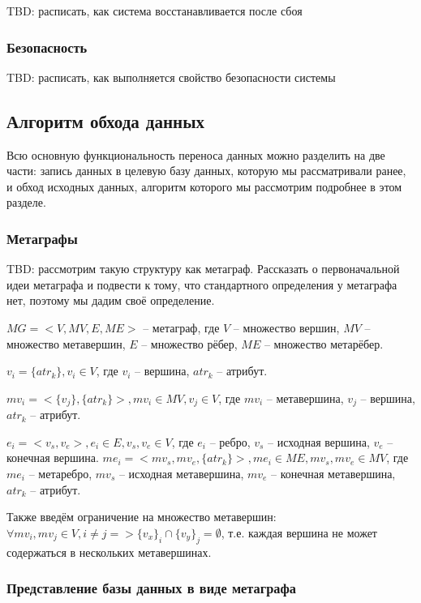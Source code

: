 TBD: расписать, как система восстанавливается после сбоя

\subsubsection{Безопасность}

TBD: расписать, как выполняется свойство безопасности системы

\subsection{Алгоритм обхода данных}

Всю основную функциональность переноса данных можно разделить на две части: запись данных в целевую базу данных, которую мы рассматривали ранее, и обход исходных данных, алгоритм которого мы рассмотрим подробнее в этом разделе.

\subsubsection{Метаграфы}
TBD: рассмотрим такую структуру как метаграф. Рассказать о первоначальной идеи метаграфа и подвести к тому, что стандартного определения у метаграфа нет, поэтому мы дадим своё определение.

$MG = <V, MV, E, ME>$ -- метаграф, где $V$ -- множество вершин, $MV$ -- множество метавершин, $E$ -- множество рёбер, $ME$ -- множество метарёбер.

$v_i = \{atr_k\}, v_i \in V$, где $v_i$ -- вершина, $atr_k$ -- атрибут.

$mv_i = <\{v_j\}, \{atr_k\}>, mv_i \in MV, v_j \in V$, где $mv_i$ -- метавершина, $v_j$ -- вершина, $atr_k$ -- атрибут.

$e_i = <v_s, v_e>, e_i \in E, v_s, v_e \in V$, где $e_i$ -- ребро, $v_s$ -- исходная вершина, $v_e$ -- конечная вершина.
$me_i = <mv_s, mv_e, \{atr_k\}>, me_i \in ME, mv_s, mv_e \in MV$, где $me_i$ -- метаребро, $mv_s$ -- исходная метавершина, $mv_e$ -- конечная метавершина, $atr_k$ -- атрибут.

Также введём ограничение на множество метавершин: $\forall mv_i, mv_j \in V, i \neq j => \{v_x\}_i \cap \{v_y\}_j = \emptyset$, т.е. каждая вершина не может содержаться в нескольких метавершинах.

\subsubsection{Представление базы данных в виде метаграфа}

